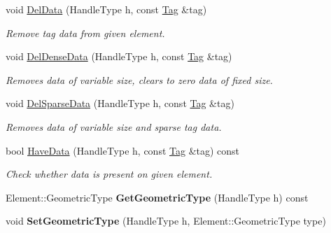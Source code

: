 \begin{DoxyCompactItemize}
void \hyperlink{classINMOST_1_1Mesh_afab20c754eef0006e3085dc546e893bb}{Del\-Data} (Handle\-Type h, const \hyperlink{classINMOST_1_1Tag}{Tag} \&tag)
\begin{DoxyCompactList}\small\item\em Remove tag data from given element. \end{DoxyCompactList}\item 
void \hyperlink{classINMOST_1_1Mesh_abac72292a681f80f9f112566e3c04bc5}{Del\-Dense\-Data} (Handle\-Type h, const \hyperlink{classINMOST_1_1Tag}{Tag} \&tag)
\begin{DoxyCompactList}\small\item\em Removes data of variable size, clears to zero data of fixed size. \end{DoxyCompactList}\item 
void \hyperlink{classINMOST_1_1Mesh_a21517e19d638410e9a5bdbaf4cc8fd4c}{Del\-Sparse\-Data} (Handle\-Type h, const \hyperlink{classINMOST_1_1Tag}{Tag} \&tag)
\begin{DoxyCompactList}\small\item\em Removes data of variable size and sparse tag data. \end{DoxyCompactList}\item 
bool \hyperlink{classINMOST_1_1Mesh_a14fe30c96eba52f03de5780503116af1}{Have\-Data} (Handle\-Type h, const \hyperlink{classINMOST_1_1Tag}{Tag} \&tag) const 
\begin{DoxyCompactList}\small\item\em Check whether data is present on given element. \end{DoxyCompactList}\item 
\hypertarget{classINMOST_1_1Mesh_a819feef3c5f1206d8bbc6775becc739e}{Element\-::\-Geometric\-Type {\bfseries Get\-Geometric\-Type} (Handle\-Type h) const }\label{classINMOST_1_1Mesh_a819feef3c5f1206d8bbc6775becc739e}

\item 
\hypertarget{classINMOST_1_1Mesh_a497dd8d40df1e33fd3040056a7922549}{void {\bfseries Set\-Geometric\-Type} (Handle\-Type h, Element\-::\-Geometric\-Type type)}\label{classINMOST_1_1Mesh_a497dd8d40df1e33fd3040056a7922549}


\end{DoxyCompactItemize}
